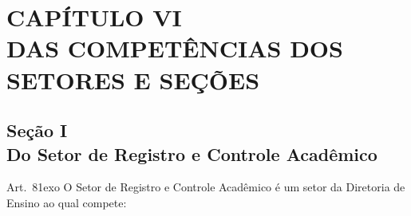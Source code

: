\documentclass[a4paper,12pt]{report}
\newcommand{\ORD}[2]{#1\raise1ex\hbox{\scriptsize#2}}
\begin{document}

\section{CAPÍTULO VI \\ DAS COMPETÊNCIAS DOS SETORES E SEÇÕES}
 

\subsection{Seção I \\ Do Setor de Registro e Controle Acadêmico}

Art.~\ORD{8}{o} O Setor de Registro e Controle Acadêmico é um setor da Diretoria de Ensino 
ao qual compete:
\end{document}

